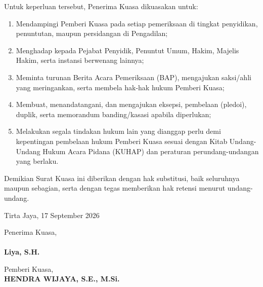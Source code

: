 \documentclass{article}
\begin{document}
Untuk keperluan tersebut, Penerima Kuasa dikuasakan untuk:
\begin{enumerate}
    \item Mendampingi Pemberi Kuasa pada setiap pemeriksaan di tingkat penyidikan, penuntutan, maupun persidangan di Pengadilan;
    \item Menghadap kepada Pejabat Penyidik, Penuntut Umum, Hakim, Majelis Hakim, serta instansi berwenang lainnya;
    \item Meminta turunan Berita Acara Pemeriksaan (BAP), mengajukan saksi/ahli yang meringankan, serta membela hak-hak hukum Pemberi Kuasa;
    \item Membuat, menandatangani, dan mengajukan eksepsi, pembelaan (pledoi), duplik, serta memorandum banding/kasasi apabila diperlukan;
    \item Melakukan segala tindakan hukum lain yang dianggap perlu demi kepentingan pembelaan hukum Pemberi Kuasa sesuai dengan Kitab Undang-Undang Hukum Acara Pidana (KUHAP) dan peraturan perundang-undangan yang berlaku.
\end{enumerate}

Demikian Surat Kuasa ini diberikan dengan hak substitusi, baik seluruhnya maupun sebagian, serta dengan tegas memberikan hak retensi menurut undang-undang. 
\vspace{1.2em}

\begin{flushright}
    Tirta Jaya, 17 September 2026 \\[2em]
\end{flushright}

\noindent
\begin{minipage}[t]{0.48\textwidth}
    Penerima Kuasa, \\[1em]
    \\[0.5em]
    \textbf{Liya, S.H.}
\end{minipage}
\hfill
\begin{minipage}[t]{0.48\textwidth}
    Pemberi Kuasa, \\[3.5em]
    \textbf{HENDRA WIJAYA, S.E., M.Si.}
\end{minipage}
\end{document}
